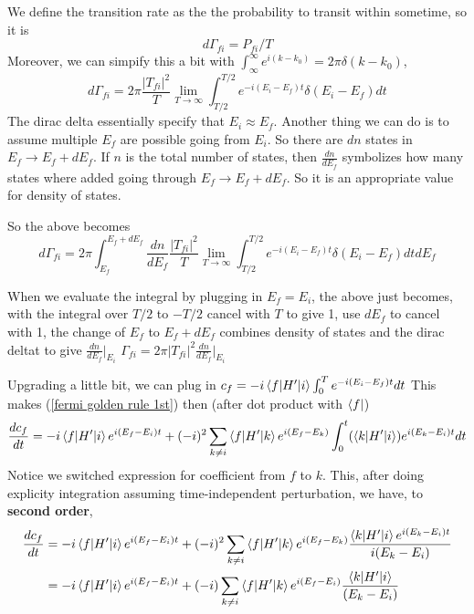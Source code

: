 \documentclass[11pt]{article}
\begin{document}
We define the transition rate as the the probability to transit within sometime, so it 
is 
\begin{equation}
    d\Gamma_{fi} = P_{fi}/T
\end{equation}
Moreover, we can simpify this a bit with $\int_\infty^\infty e^{i(k-k_0)} = 2\pi \delta(k-k_0)$,
\begin{equation}
    d\Gamma_{fi} = 2\pi \frac{|T_{fi}|^2}{T} \lim_{T\to \infty}\int_{T/2}^{T/2}e^{-i(E_i- E_f)t}\delta(E_i-E_f) dt
\end{equation}
The dirac delta essentially specify that $E_i\approx E_f$. Another thing we can do is to assume multiple $E_f$ are possible going from $E_i$.
So there are $dn$ states in $E_f\to E_f+dE_f$. If $n$ is the total number of states, then $\frac{dn}{dE_f}$ symbolizes how many states where added going through $E_f\to E_f+dE_f$. So it is an 
appropriate value for density of states. 

So the above becomes 
\begin{equation}
    d\Gamma_{fi} = 2\pi \int_{E_f}^{E_f+dE_f} \frac{dn}{dE_f}\frac{|T_{fi}|^2}{T} \lim_{T\to \infty}\int_{T/2}^{T/2}e^{-i(E_i- E_f)t}\delta(E_i-E_f) dt dE_f
\end{equation}

When we evaluate the integral by plugging in $E_f = E_i$,
the above just becomes, with the integral over $T/2$ to $-T/2$ cancel with $T$ to give 1, use $dE_f$ to cancel with 
1, the change of $E_f$ to $E_f+ dE_f$ combines density of states and the dirac deltat to give $\frac{dn}{dE_f}|_{E_i}$ 
$\Gamma_{fi} = 2\pi |T_{fi}|^2 \frac{dn}{dE_f}|_{E_i}$

Upgrading a little bit, we can plug in $c_f = - i \braket{f|H'|i}\int_0^T e^{-i(E_i-E_f)t}dt$
This makes (\ref{fermi golden rule 1st}) then (after dot product with $\bra{f}$)
\begin{equation}
    \frac{d c_f}{dt} = -i \braket{f|H'|i}e^{i (E_f-E_i) t} + (-i)^2 \sum_{k\neq i}\braket{f|H'|k} e^{i(E_f-E_k)}\int^t_0(\braket{k|H'|i})e^{i(E_k-E_i)t}dt
\end{equation}
Notice we switched expression for coefficient from $f$ to $k$.
This, after doing explicity integration assuming time-independent perturbation, we have, to \textbf{second order},
\begin{align}
    \frac{d c_f}{dt} &= -i \braket{f|H'|i}e^{i (E_f-E_i) t} + (-i)^2 \sum_{k\neq i}\braket{f|H'|k} e^{i(E_f-E_k)} \frac{\braket{k|H'|i}e^{i(E_k-E_i)t}}{i(E_k-E_i)}\\
    &= -i \braket{f|H'|i}e^{i (E_f-E_i) t} + (-i) \sum_{k\neq i}\braket{f|H'|k} e^{i(E_f-E_i)} \frac{\braket{k|H'|i}}{(E_k-E_i)}\\
\end{align}
\end{document}
